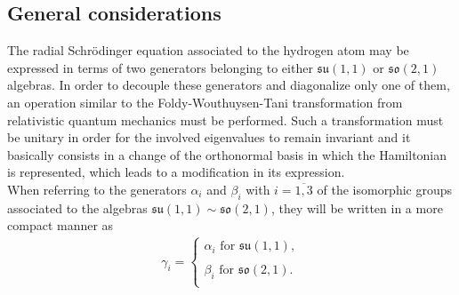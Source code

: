 \documentclass[12pt,a4paper]{report}
\theoremstyle{definition}
\theoremstyle{remark}
\theoremstyle{remark}
\begin{document}
\begin{appendices}
\section{General considerations}
The radial Schrödinger equation associated to the hydrogen atom may be expressed in terms of two generators belonging to either $\mathfrak{su}(1,1)$ or $\mathfrak{so}(2,1)$ algebras. In order to decouple these generators and diagonalize only one of them, an operation similar to the Foldy-Wouthuysen-Tani transformation from relativistic quantum mechanics \cite{bjorken} must be performed. Such a transformation must be unitary in order for the involved eigenvalues to remain invariant and it basically consists in a change of the orthonormal basis in which the Hamiltonian is represented, which leads to a modification in its expression.  \\ \indent
When referring to the generators $\alpha_i$ and $\beta_i$ with $i=\overline{1,3}$ of the isomorphic groups associated to the algebras $\mathfrak{su}(1,1)\sim \mathfrak{so}(2,1)$, they will be written in a more compact manner as
\begin{align*}
\gamma_i=\left\{
\begin{array}{ll}
\alpha_i \text{ for } \mathfrak{su}(1,1),\\ \\
\beta_i \text{ for } \mathfrak{so}(2,1).\\
\end{array}
\right.
\end{align*} 


\end{appendices}
\end{document}
